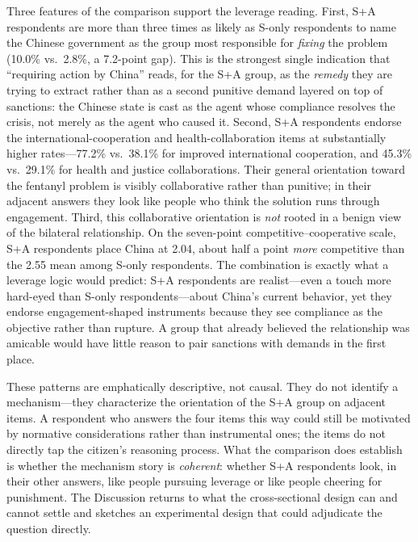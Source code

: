 \documentclass[12pt,letterpaper]{article}
\begin{document}
Three features of the comparison support the leverage reading. First, S+A respondents are more than three times as likely as S-only respondents to name the Chinese government as the group most responsible for \emph{fixing} the problem (10.0\% vs.\ 2.8\%, a 7.2-point gap). This is the strongest single indication that ``requiring action by China'' reads, for the S+A group, as the \emph{remedy} they are trying to extract rather than as a second punitive demand layered on top of sanctions: the Chinese state is cast as the agent whose compliance resolves the crisis, not merely as the agent who caused it. Second, S+A respondents endorse the international-cooperation and health-collaboration items at substantially higher rates---77.2\% vs.\ 38.1\% for improved international cooperation, and 45.3\% vs.\ 29.1\% for health and justice collaborations. Their general orientation toward the fentanyl problem is visibly collaborative rather than punitive; in their adjacent answers they look like people who think the solution runs through engagement. Third, this collaborative orientation is \emph{not} rooted in a benign view of the bilateral relationship. On the seven-point competitive--cooperative scale, S+A respondents place China at 2.04, about half a point \emph{more} competitive than the 2.55 mean among S-only respondents. The combination is exactly what a leverage logic would predict: S+A respondents are realist---even a touch more hard-eyed than S-only respondents---about China's current behavior, yet they endorse engagement-shaped instruments because they see compliance as the objective rather than rupture. A group that already believed the relationship was amicable would have little reason to pair sanctions with demands in the first place.

These patterns are emphatically descriptive, not causal. They do not identify a mechanism---they characterize the orientation of the S+A group on adjacent items. A respondent who answers the four items this way could still be motivated by normative considerations rather than instrumental ones; the items do not directly tap the citizen's reasoning process. What the comparison does establish is whether the mechanism story is \emph{coherent}: whether S+A respondents look, in their other answers, like people pursuing leverage or like people cheering for punishment. The Discussion returns to what the cross-sectional design can and cannot settle and sketches an experimental design that could adjudicate the question directly.

\end{document}
